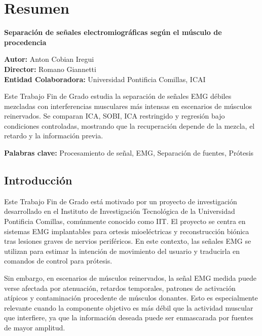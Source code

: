 \pagestyle{plain}
\chapter*{Resumen}

\begin{flushleft}
  {\Large\bfseries Separación de señales electromiográficas según el músculo de procedencia\\[0.4cm]}

  \textbf{Autor:} Anton Cobian Iregui\\
  \textbf{Director:} Romano Giannetti\\
  \textbf{Entidad Colaboradora:} Universidad Pontificia Comillas, ICAI
\end{flushleft}
Este Trabajo Fin de Grado estudia la separación de señales EMG débiles mezcladas con
interferencias musculares más intensas en escenarios de músculos reinervados. Se comparan ICA, SOBI,
ICA restringido y regresión bajo condiciones controladas, mostrando que la recuperación depende de la mezcla, el retardo y la información previa.

\medskip
\noindent\textbf{Palabras clave:} 
Procesamiento de señal, EMG, Separación de fuentes, Prótesis
\bigskip

\section*{Introducción}

Este Trabajo Fin de Grado está motivado por un proyecto de investigación desarrollado en el Instituto de Investigación Tecnológica de la Universidad Pontificia Comillas, comúnmente conocido como IIT. El proyecto se centra en sistemas EMG implantables para ortesis mioeléctricas y reconstrucción biónica tras lesiones graves de nervios periféricos. En este contexto, las señales EMG se utilizan para estimar la intención de movimiento del usuario y traducirla en comandos de control para prótesis.

Sin embargo, en escenarios de músculos reinervados, la señal EMG medida puede verse afectada por atenuación, retardos temporales, patrones de activación atípicos y contaminación procedente de músculos donantes. Esto es especialmente relevante cuando la componente objetivo es más débil que la actividad muscular que interfiere, ya que la información deseada puede ser enmascarada por fuentes de mayor amplitud.

